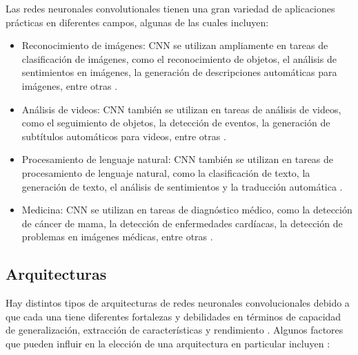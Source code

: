 Las redes neuronales convolutionales tienen una gran variedad de aplicaciones prácticas en diferentes campos, algunas
de las cuales incluyen:
\begin{itemize}
    \item Reconocimiento de imágenes: CNN se utilizan ampliamente en tareas de clasificación de imágenes, como el reconocimiento
          de objetos, el análisis de sentimientos en imágenes, la generación de descripciones automáticas para imágenes, entre
          otras \parencite{krizhevsky2017imagenet}.
    \item Análisis de videos: CNN también se utilizan en tareas de análisis de videos, como el seguimiento de objetos, la
          detección de eventos, la generación de subtítulos automáticos para videos, entre otras \parencite{simonyan2014twostream}.
    \item Procesamiento de lenguaje natural: CNN también se utilizan en tareas de procesamiento de lenguaje natural, como la
          clasificación de texto, la generación de texto, el análisis de sentimientos y la traducción automática \parencite{bugnon2020dl4papers}.
    \item Medicina: CNN se utilizan en tareas de diagnóstico médico, como la detección de cáncer de mama, la detección de
          enfermedades cardíacas, la detección de problemas en imágenes médicas, entre otras \parencite{wang2016deep}.
\end{itemize}

\subsection{Arquitecturas}

Hay distintos tipos de arquitecturas de redes neuronales convolucionales debido a que cada una tiene diferentes
fortalezas y debilidades en términos de capacidad de generalización, extracción de características y rendimiento \parencite{lecun2015deep}. Algunos factores que pueden influir en la elección de una arquitectura en particular incluyen \parencite{he2016deep}:

